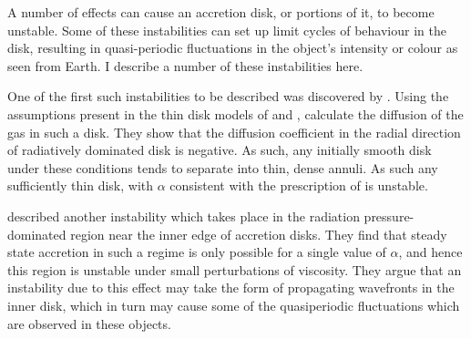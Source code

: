 \par{} A number of effects can cause an accretion disk, or portions of it, to become unstable.  Some of these instabilities can set up limit cycles of behaviour in the disk, resulting in quasi-periodic fluctuations in the object's intensity or colour as seen from Earth.  I describe a number of these instabilities here.
\par One of the first such instabilities to be described was discovered by \citet{Lightman_Instability}.  Using the assumptions present in the thin disk models of \citet{Shakura_Disk} and \citet{Novikov_Torque}, \citeauthor{Lightman_Instability} calculate the diffusion of the gas in such a disk.  They show that the diffusion coefficient in the radial direction of radiatively dominated disk is negative.  As such, any initially smooth disk under these conditions tends to separate into thin, dense annuli.  As such any sufficiently thin disk, with $\alpha$ consistent with the prescription of \citet{Shakura_Disk} is unstable.
\par \citet{Shakura_Instab} described another instability which takes place in the radiation pressure-dominated region near the inner edge of accretion disks.  They find that steady state accretion in such a regime is only possible for a single value of $\alpha$, and hence this region is unstable under small perturbations of viscosity.  They argue that an instability due to this effect may take the form of propagating wavefronts in the inner disk, which in turn may cause some of the quasiperiodic fluctuations which are observed in these objects.

\label{sec:hic}

